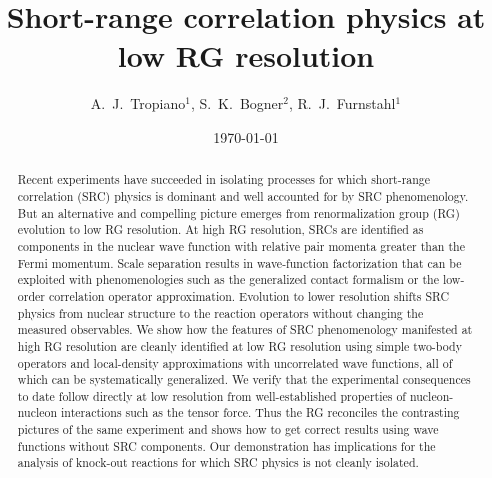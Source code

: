 \documentclass[10pt,aps,prc,floatfix,twocolumn,nofootinbib]{revtex4-1}
\begin{document}
\title{Short-range correlation physics at low RG resolution}


\author{A.~J.~Tropiano$^{1}$, S.~K.~Bogner$^{2}$, R.~J.~Furnstahl$^{1}$}


\date{\today}

\begin{abstract}
Recent experiments have succeeded in isolating processes for which short-range correlation (SRC) physics is dominant and well accounted for by SRC phenomenology.
But an alternative and compelling picture emerges from renormalization group (RG) evolution to low RG resolution.
At high RG resolution, SRCs are identified as components in the nuclear wave function with relative pair momenta greater than the Fermi momentum.
Scale separation results in wave-function factorization that can be exploited with phenomenologies such as the generalized contact formalism or the low-order correlation operator approximation. 
Evolution to lower resolution shifts SRC physics from nuclear structure to the reaction operators without changing the measured observables.
We show how the features of SRC phenomenology manifested at high RG resolution are cleanly identified 
at low RG resolution
using simple two-body operators and local-density approximations with uncorrelated wave functions,
all of which can be systematically generalized.
We verify that the experimental consequences to date follow directly at low resolution from well-established properties of nucleon-nucleon interactions such as the tensor force.
Thus the RG reconciles the contrasting pictures of the same experiment and shows how to get correct results using wave functions without SRC components.
Our demonstration has implications for the analysis of knock-out reactions for which SRC physics is not cleanly isolated.
\end{abstract}

\maketitle

\newpage
\end{document}
